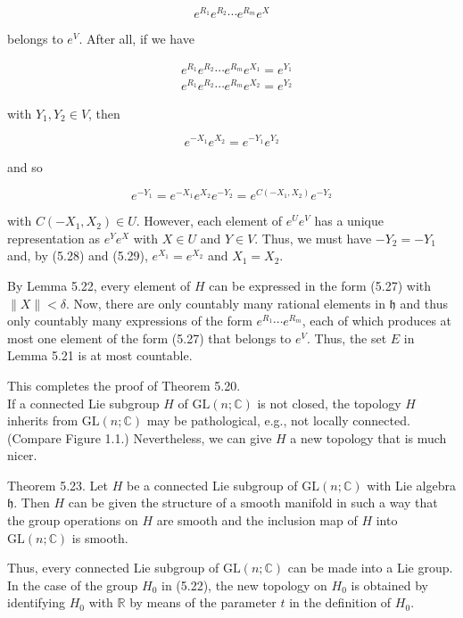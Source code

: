 \documentclass[10pt, letterpaper]{article}
\begin{document}
$$
e^{R_{1}} e^{R_{2}} \cdots e^{R_{m}} e^{X}
$$

belongs to $e^{V}$. After all, if we have

$$
\begin{aligned}
& e^{R_{1}} e^{R_{2}} \cdots e^{R_{m}} e^{X_{1}}=e^{Y_{1}} \\
& e^{R_{1}} e^{R_{2}} \cdots e^{R_{m}} e^{X_{2}}=e^{Y_{2}}
\end{aligned}
$$

with $Y_{1}, Y_{2} \in V$, then

$$
e^{-X_{1}} e^{X_{2}}=e^{-Y_{1}} e^{Y_{2}}
$$

and so

$$
e^{-Y_{1}}=e^{-X_{1}} e^{X_{2}} e^{-Y_{2}}=e^{C\left(-X_{1}, X_{2}\right)} e^{-Y_{2}}
$$

with $C\left(-X_{1}, X_{2}\right) \in U$. However, each element of $e^{U} e^{V}$ has a unique representation as $e^{Y} e^{X}$ with $X \in U$ and $Y \in V$. Thus, we must have $-Y_{2}=-Y_{1}$ and, by (5.28) and (5.29), $e^{X_{1}}=e^{X_{2}}$ and $X_{1}=X_{2}$.

By Lemma 5.22, every element of $H$ can be expressed in the form (5.27) with $\|X\|<\delta$. Now, there are only countably many rational elements in $\mathfrak{h}$ and thus only countably many expressions of the form $e^{R_{1}} \cdots e^{R_{m}}$, each of which produces at most one element of the form (5.27) that belongs to $e^{V}$. Thus, the set $E$ in Lemma 5.21 is at most countable.

This completes the proof of Theorem 5.20.\\
If a connected Lie subgroup $H$ of $\mathrm{GL}(n ; \mathbb{C})$ is not closed, the topology $H$ inherits from $\mathrm{GL}(n ; \mathbb{C})$ may be pathological, e.g., not locally connected. (Compare Figure 1.1.) Nevertheless, we can give $H$ a new topology that is much nicer.

Theorem 5.23. Let $H$ be a connected Lie subgroup of $\mathrm{GL}(n ; \mathbb{C})$ with Lie algebra $\mathfrak{h}$. Then $H$ can be given the structure of a smooth manifold in such a way that the group operations on $H$ are smooth and the inclusion map of $H$ into $\mathrm{GL}(n ; \mathbb{C})$ is smooth.

Thus, every connected Lie subgroup of $\mathrm{GL}(n ; \mathbb{C})$ can be made into a Lie group. In the case of the group $H_{0}$ in (5.22), the new topology on $H_{0}$ is obtained by identifying $H_{0}$ with $\mathbb{R}$ by means of the parameter $t$ in the definition of $H_{0}$.
\end{document}
